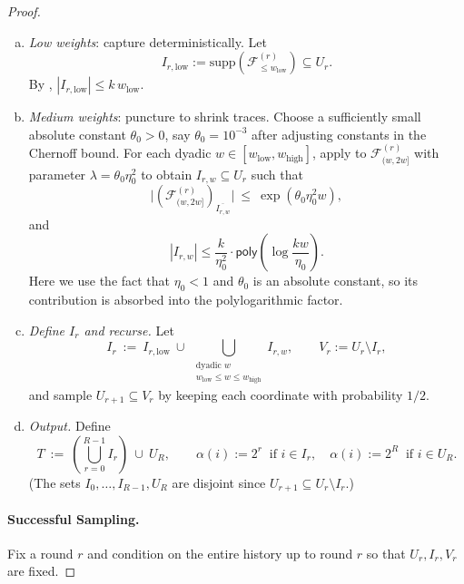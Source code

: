 \documentclass[10pt,a4paper]{amsart}
\DeclareMathOperator{\high}{\mathrm{high}}
\DeclareMathOperator{\low}{\mathrm{low}}
\newcommand{\calF}{\mathcal{F}}
\newcommand{\poly}{\mathsf{poly}}
\newcommand{\supp}{\mathrm{supp}}
\begin{document}
\begin{proof}
\smallskip
\begin{enumerate}[(a)]
    \item \emph{Low weights}: capture deterministically. Let
    \[
    I_{r,\mathrm{low}}:=\supp\!\left(\calF^{(r)}_{\le w_{\low}}\right)\subseteq U_r.
    \]
    By , $|I_{r,\mathrm{low}}|\le k\,w_{\low}$.
    \item \emph{Medium weights}: puncture to shrink traces. Choose a sufficiently small absolute constant $\theta_0 > 0$, say $\theta_0 = 10^{-3}$ after adjusting constants in
    the Chernoff bound. 
    For each dyadic $w\in[w_{\low},w_{\high}]$, apply 
    to $\calF^{(r)}_{(w,2w]}$ with parameter $\lambda = \theta_0 \eta_0^2$ to obtain $I_{r,w}\subseteq U_r$
    such that
    \begin{equation}\label{eq:medium_trace_bound_v2}
    \big|\left(\calF^{(r)}_{(w,2w]}\right)_{\overline{I_{r,w}}}\big|
    \ \le\
    \exp (\theta_0 \eta_0^2 w),
    \end{equation}
    and
    \[
    |I_{r, w}| \leq \frac{k}{\eta_0^2} \cdot \poly \left(\log \frac{kw}{\eta_0} \right).
    \]
    Here we use the fact that $\eta_0 < 1$ and $\theta_0$ is an absolute constant, so its contribution is absorbed into the polylogarithmic factor.
    \item \emph{Define $I_r$ and recurse.} Let
    \[
    I_r\ :=\ I_{r,\mathrm{low}} \ \cup\ \bigcup_{\substack{\text{dyadic }w\\ w_{\low}\le w\le w_{\high}}} I_{r,w},
    \qquad
    V_r:=U_r\setminus I_r,
    \]
    and sample $U_{r+1}\subseteq V_r$ by keeping each coordinate with probability $1/2$.
    \item \emph{Output.} Define
    \[
    T\ :=\ \left(\bigcup_{r=0}^{R-1} I_r\right)\ \cup\ U_R,
    \qquad
    \alpha(i):=2^r\ \text{ if } i\in I_r,\quad \alpha(i):=2^R\ \text{ if } i\in U_R.
    \]
    (The sets $I_0,\dots,I_{R-1},U_R$ are disjoint since $U_{r+1}\subseteq U_r\setminus I_r$.)
\end{enumerate}



\paragraph{Successful Sampling.}
Fix a round $r$ and condition on the entire history up to round $r$ so that $U_r,I_r,V_r$ are fixed.


\end{proof}
\end{document}
